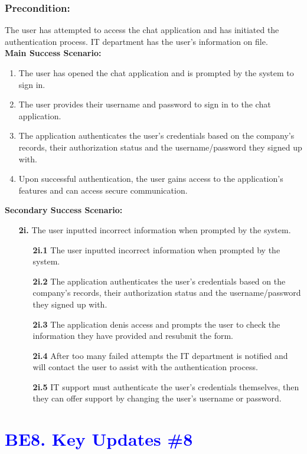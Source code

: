 \documentclass[]{article}
\begin{document}
\subsubsection*{Precondition:} The user has attempted to access the chat application and has initiated the authentication process. IT department has the user's information on file.\\
\textbf{Main Success Scenario:}
\begin{enumerate}
	\item The user has opened the chat application and is prompted by the system to sign in.
	\item The user provides their username and password to sign in to the chat application.
	\item The application authenticates the user's credentials based on the company's records, their authorization status and the username/password they signed up with.
	\item Upon successful authentication, the user gains access to the application's features and can access secure communication.
\end{enumerate}
\textbf{Secondary Success Scenario:}
\begin{enumerate}
	\item[\textbf{2i.}] The user inputted incorrect information when prompted by the system.
		\begin{enumerate}
			\item[\textbf{2i.1}] The user inputted incorrect information when prompted by the system.
			\item[\textbf{2i.2}] The application authenticates the user's credentials based on the company's records, their authorization status and the username/password they signed up with.
			\item[\textbf{2i.3}] The application denis access and prompts the user to check the information they have provided and resubmit the form.
			\item[\textbf{2i.4}] After too many failed attempts the IT department is notified and will contact the user to assist with the authentication process.
			\item[\textbf{2i.5}] IT support must authenticate the user's credentials themselves, then they can offer support by changing the user's username or password.
		\end{enumerate}
\end{enumerate}

\section*{\textcolor{blue}{BE8. Key Updates \#8}}
\end{document}
